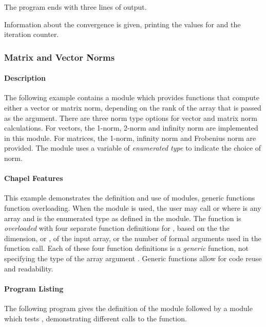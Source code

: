 The program ends with three lines of output.
\begin{chapel}
  writeln("Jacobi computation complete.");  
  writeln("Delta is ", delta, " (< epsilon = ", epsilon, ")");
  writeln("# of iterations: ", iteration); 
}
\end{chapel}
Information about the convergence is given, printing the values
for  and the iteration counter.

\subsubsection{Matrix and Vector Norms}

\paragraph{Description}
The following example contains a module  which provides  
 functions that compute either a vector or matrix norm, depending
on the rank of the array that is passed as the argument.  There are three
norm type options for vector and matrix norm calculations.  For vectors,  
the 1-norm, 2-norm and infinity norm are implemented in this module.  
For matrices, the 1-norm, infinity norm and Frobenius norm are provided.   
The module uses a variable of {\em enumerated type}  to 
indicate the choice of norm.

\paragraph{Chapel Features}
This example demonstrates the definition and use of modules, generic functions
function overloading.
When the  module is used, the user may call 
 or  where
 is any array and  is the enumerated type as defined
in the  module.  The  function is {\em overloaded} with
four separate function definitions for , based on the
the dimension, or , of the input array, or the number of formal
arguments used in the  function call.  Each of these four function
definitions is a {\em generic} function, not specifying the type of the array
argument .  Generic functions allow for code reuse and readability.

\paragraph{Program Listing}
The following program gives the definition of the  module followed
by a module which tests , demonstrating different calls to the 
function.

